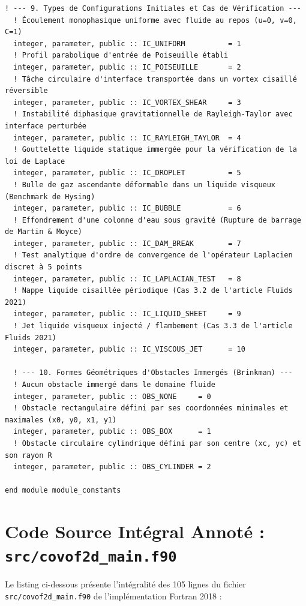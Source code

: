 \documentclass[10pt,a4paper,oneside]{book}
\begin{document}
\begin{lstlisting}[language={[95]Fortran}]
  ! --- 9. Types de Configurations Initiales et Cas de Vérification ---
  ! Écoulement monophasique uniforme avec fluide au repos (u=0, v=0, C=1)
  integer, parameter, public :: IC_UNIFORM          = 1
  ! Profil parabolique d'entrée de Poiseuille établi
  integer, parameter, public :: IC_POISEUILLE       = 2
  ! Tâche circulaire d'interface transportée dans un vortex cisaillé réversible
  integer, parameter, public :: IC_VORTEX_SHEAR     = 3
  ! Instabilité diphasique gravitationnelle de Rayleigh-Taylor avec interface perturbée
  integer, parameter, public :: IC_RAYLEIGH_TAYLOR  = 4
  ! Gouttelette liquide statique immergée pour la vérification de la loi de Laplace
  integer, parameter, public :: IC_DROPLET          = 5
  ! Bulle de gaz ascendante déformable dans un liquide visqueux (Benchmark de Hysing)
  integer, parameter, public :: IC_BUBBLE           = 6
  ! Effondrement d'une colonne d'eau sous gravité (Rupture de barrage de Martin & Moyce)
  integer, parameter, public :: IC_DAM_BREAK        = 7
  ! Test analytique d'ordre de convergence de l'opérateur Laplacien discret à 5 points
  integer, parameter, public :: IC_LAPLACIAN_TEST   = 8
  ! Nappe liquide cisaillée périodique (Cas 3.2 de l'article Fluids 2021)
  integer, parameter, public :: IC_LIQUID_SHEET     = 9
  ! Jet liquide visqueux injecté / flambement (Cas 3.3 de l'article Fluids 2021)
  integer, parameter, public :: IC_VISCOUS_JET      = 10

  ! --- 10. Formes Géométriques d'Obstacles Immergés (Brinkman) ---
  ! Aucun obstacle immergé dans le domaine fluide
  integer, parameter, public :: OBS_NONE     = 0
  ! Obstacle rectangulaire défini par ses coordonnées minimales et maximales (x0, y0, x1, y1)
  integer, parameter, public :: OBS_BOX      = 1
  ! Obstacle circulaire cylindrique défini par son centre (xc, yc) et son rayon R
  integer, parameter, public :: OBS_CYLINDER = 2

end module module_constants

\end{lstlisting}

\section{Code Source Intégral Annoté : \texttt{src/covof2d\_main.f90}}
Le listing ci-dessous présente l'intégralité des 105 lignes du fichier \texttt{src/covof2d\_main.f90} de l'implémentation Fortran 2018 :
\end{document}
